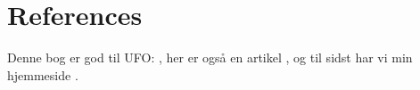 \section{References}

Denne bog er god til UFO: \cite{katelUFO}, her er også en artikel \cite{sen2005cute}, og til sidst har vi min hjemmeside \cite{andreasvikke}.